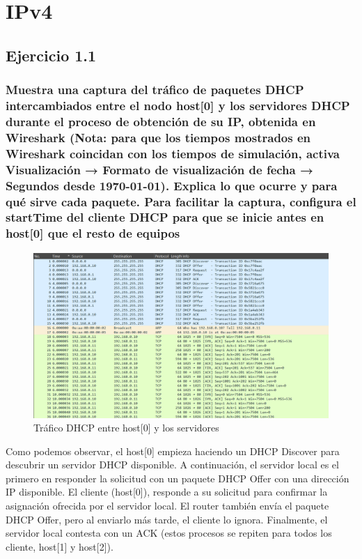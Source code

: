 \chapter{IPv4}
\label{chap:ipv4}

\section{Ejercicio 1.1}

\subsection{Muestra una captura del tráfico de paquetes DHCP intercambiados entre el nodo host[0] y los servidores
DHCP durante el proceso de obtención de su IP, obtenida en Wireshark (Nota: para que los tiempos mostrados
en Wireshark coincidan con los tiempos de simulación, activa Visualización → Formato de visualización de fecha
→ Segundos desde 1970-01-01). Explica lo que ocurre y para qué sirve cada paquete. Para facilitar la captura,
configura el startTime del cliente DHCP para que se inicie antes en host[0] que el resto de equipos}

\begin{figure}[!ht]
    \centering
    \includegraphics[width=135mm, scale=0.75]{imaxes/captura_ejer1_1.png}
    \caption{Tráfico DHCP entre host[0] y los servidores}
    \label{fig:captura_host0}
\end{figure}

Como podemos observar, el host[0] empieza haciendo un DHCP Discover para descubrir un servidor DHCP disponible. 
A continuación, el servidor local es el primero en responder la solicitud con un paquete DHCP Offer con una dirección IP disponible. El cliente (host[0]),
responde a su solicitud para confirmar la asignación ofrecida por el servidor local. El router también envía el paquete DHCP Offer, pero al enviarlo más tarde,
el cliente lo ignora. Finalmente, el servidor local contesta con un ACK (estos procesos se repiten para todos los cliente, host[1] y host[2]).

